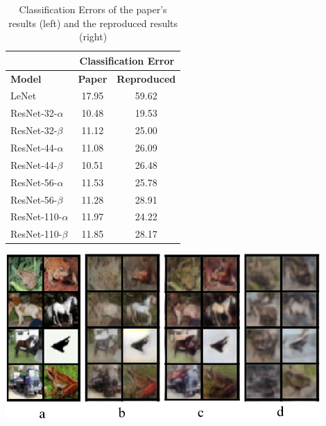 \begin{table}
	\begin{minipage}{0.5\linewidth}
		\centering
		\captionsetup{justification=centering}
		\setlength{\abovecaptionskip}{5pt}
		\caption{Classification Errors of the paper's results (left) and the reproduced results (right)}
        \begin{tabular}{l|c|c}
        \hline
        \multicolumn{1}{c|}{} & \multicolumn{2}{|c}{Classification Error} \\
        \hline
        \textbf{Model} & \textbf{Paper} & \textbf{Reproduced} \\
        \hline
        LeNet & 17.95 & 59.62 \\
        ResNet-32-$\alpha$ & 10.48 & 19.53 \\
        ResNet-32-$\beta$ & 11.12 & 25.00 \\
        ResNet-44-$\alpha$ & 11.08 & 26.09 \\
        ResNet-44-$\beta$ & 10.51 & 26.48 \\
        ResNet-56-$\alpha$ & 11.53 & 25.78 \\
        ResNet-56-$\beta$ & 11.28 & 28.91 \\
        ResNet-110-$\alpha$ & 11.97 & 24.22 \\
        ResNet-110-$\beta$ & 11.85 & 28.17 \\
        \end{tabular}
        
        \label{accuracy-table}
	\end{minipage}\hfill
	\begin{minipage}{0.45\linewidth}
    	\centering
    	\setlength{\abovecaptionskip}{5pt}
        \includegraphics[width=0.9\textwidth]{../openreview/images/image_reconstructions.PNG}
        \label{fig:kanonymity}
	\end{minipage}
\end{table}

